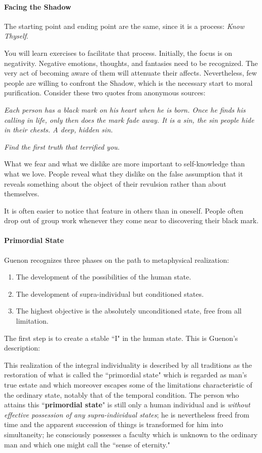 \paragraph{Facing the Shadow}
The starting point and ending point are the same, since it is a process: \emph{Know Thyself}.

You will learn exercises to facilitate that process. Initially, the focus is on negativity. Negative emotions, thoughts, and fantasies need to be recognized. The very act of becoming aware of them will attenuate their affects. Nevertheless, few people are willing to confront the Shadow, which is the necessary start to moral purification. Consider these two quotes from anonymous sources:

\emph{Each person has a black mark on his heart when he is born. Once he finds his calling in life, only then does the mark fade away. It is a sin, the sin people hide in their chests. A deep, hidden sin.}

\emph{Find the first truth that terrified you.}

What we fear and what we dislike are more important to self-knowledge than what we love. People reveal what they dislike on the false assumption that it reveals something about the object of their revulsion rather than about themselves.

It is often easier to notice that feature in others than in oneself. People often drop out of group work whenever they come near to discovering their black mark.

\paragraph{Primordial State}
Guenon recognizes three phases on the path to metaphysical realization:

\begin{enumerate}
\item The development of the possibilities of the human state. 
\item The development of supra-individual but conditioned states. 
\item The highest objective is the absolutely unconditioned state, free from all limitation. 
\end{enumerate}
The first step is to create a stable ``I" in the human state. This is Guenon's description:

\begin{quotex}
This realization of the integral individuality is described by all traditions as the restoration of what is called the ``primordial state" which is regarded as man's true estate and which moreover escapes some of the limitations characteristic of the ordinary state, notably that of the temporal condition. The person who attains this ``\textbf{primordial state}" is still only a human individual and is \emph{without effective possession of any supra-individual states}; he is nevertheless freed from time and the apparent succession of things is transformed for him into simultaneity; he consciously possesses a faculty which is unknown to the ordinary man and which one might call the ``sense of eternity." 

\end{quotex}
